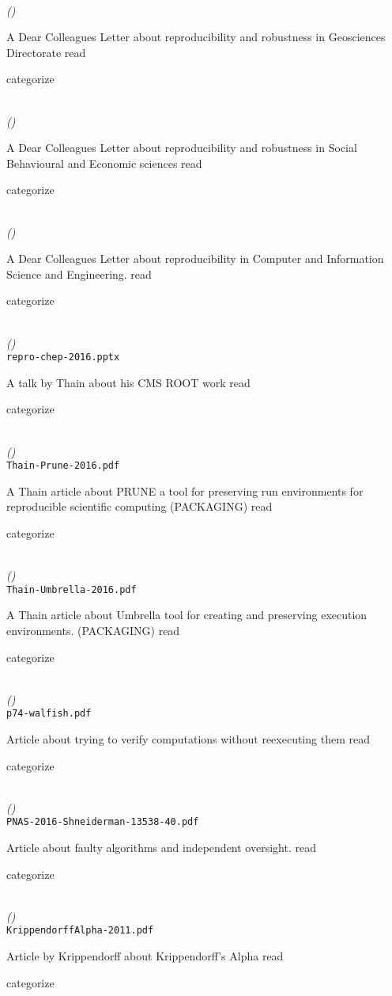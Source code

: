 \documentclass{article}
\newcommand{\Read}{
	\gls{read}
}
\newcommand{\categorize}{
	\gls{categorize}
}
\newenvironment{refdef}[2] {
	\noindent \textbf{\citetitle{#1}} \cite{#1}\\ \citejournalorbooktitle{#1} \textit{(\citeyear{#1})}\\ \texttt{#2} \vspace{0.2in} \par 
} {
\vspace{0.2in}
}
\begin{document}
\begin{refdef}{nsf-dcl-repro-robust-2016}{}
A Dear Colleagues Letter about reproducibility and robustness in Geosciences Directorate \Read \categorize
\end{refdef}

\begin{refdef}{nsf-dcl-robust-reliable-2016}{}
A Dear Colleagues Letter about reproducibility and robustness in Social Behavioural and Economic sciences \Read \categorize
\end{refdef}

\begin{refdef}{nsf-dcl-repro-comput-2016}{}
A Dear Colleagues Letter about reproducibility in Computer and Information Science and Engineering. \Read \categorize
\end{refdef}

\begin{refdef}{Thain-CMS-Root-NonDeterminism-CHEP-2016}{repro-chep-2016.pptx}
A talk by Thain about his CMS ROOT work \Read \categorize
\end{refdef}

\begin{refdef}{Thain-Prune-2016}{Thain-Prune-2016.pdf}
A Thain article about PRUNE a tool for preserving run environments for reproducible scientific computing (PACKAGING) \Read \categorize
\end{refdef}

\begin{refdef}{Thain-Umbrella-2016}{Thain-Umbrella-2016.pdf}
A Thain article about Umbrella tool for creating and preserving execution environments. (PACKAGING) \Read \categorize
\end{refdef}

\begin{refdef}{walfish-verifying-2015}{p74-walfish.pdf}
Article about trying to verify computations without reexecuting them \Read \categorize
\end{refdef}

\begin{refdef}{Shneiderman29112016}{PNAS-2016-Shneiderman-13538-40.pdf}
Article about faulty algorithms and independent oversight. \Read \categorize
\end{refdef}

\begin{refdef}{KrippendorffAlpha-2011}{KrippendorffAlpha-2011.pdf}
Article by Krippendorff about Krippendorff's Alpha \Read \categorize
\end{refdef}
\end{document}
